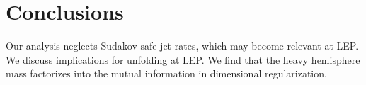 \section{Conclusions}\label{sec:conclusions}

Our analysis neglects Sudakov-safe jet rates, which may become relevant
at LEP. We discuss implications for unfolding at LEP. We find that the
heavy hemisphere mass factorizes into the mutual information in
dimensional regularization.


